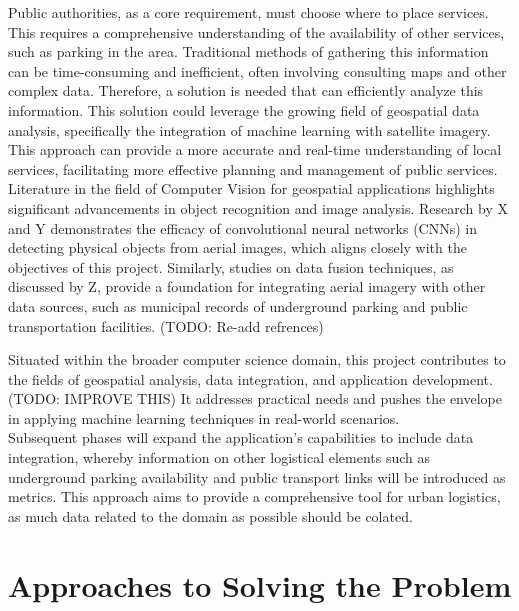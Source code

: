 Public authorities, as a core requirement, must choose where to place services.
This requires a comprehensive understanding of the availability of other
services, such as parking in the area. Traditional methods of gathering this
information can be time-consuming and inefficient, often involving consulting
maps and other complex data. Therefore, a solution is needed that can
efficiently analyze this information. This solution could leverage the growing
field of geospatial data analysis, specifically the integration of machine
learning with satellite imagery. This approach can provide a more accurate and
real-time understanding of local services, facilitating more effective planning
and management of public services.\\

\noindent{}Literature in the field of Computer Vision for geospatial
applications highlights significant advancements in object recognition and image
analysis. Research by X and Y demonstrates the efficacy of convolutional neural
networks (CNNs) in detecting physical objects from aerial images, which aligns
closely with the objectives of this project. Similarly, studies on data fusion
techniques, as discussed by Z, provide a foundation for integrating aerial
imagery with other data sources, such as municipal records of underground
parking and public transportation facilities. (TODO: Re-add refrences)\\

\newpage{}

\noindent{}Situated within the broader computer science domain, this project
contributes to the fields of geospatial analysis, data integration, and
application development. (TODO: IMPROVE THIS) It addresses practical needs and
pushes the envelope in applying machine learning techniques in real-world
scenarios.\\

\noindent{}Subsequent phases will expand the application’s capabilities to
include data integration, whereby information on other logistical elements such
as underground parking availability and public transport links will be
introduced as metrics. This approach aims to provide a comprehensive tool for
urban logistics, as much data related to the domain as possible should
be colated.\\

\newpage{}

\section{Approaches to Solving the Problem}
